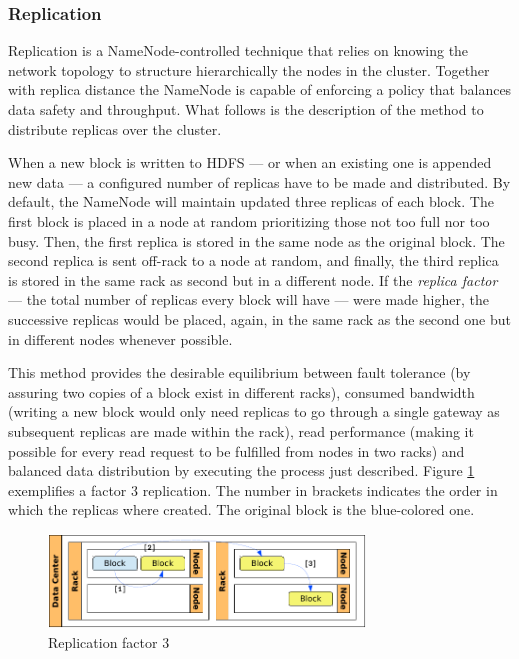 \subsubsection{Replication}\label{subsubsec:replicacionbloques}
\noindent Replication is a NameNode-controlled technique that relies on knowing the network topology to structure hierarchically the nodes in the cluster. Together with replica distance the NameNode is capable of enforcing a policy that balances data safety and throughput. What follows is the description of the method to distribute replicas over the cluster.

When a new block is written to HDFS --- or when an existing one is appended new data --- a configured number of replicas have to be made and distributed. By default, the NameNode will maintain updated three replicas of each block. The first block is placed in a node at random prioritizing those not too full nor too busy. Then, the first replica is stored in the same node as the original block. The second replica is sent off-rack to a node at random, and finally, the third replica is stored in the same rack as second but in a different node. If the \emph{replica factor} --- the total number of replicas every block will have --- were made higher, the successive replicas would be placed, again, in the same rack as the second one but in different nodes whenever possible.

This method provides the desirable equilibrium between fault tolerance (by assuring two copies of a block exist in different racks), consumed bandwidth (writing a new block would only need replicas to go through a single gateway as subsequent replicas are made within the rack), read performance (making it possible for every read request to be fulfilled from nodes in two racks) and balanced data distribution by executing the process just described. Figure \ref{fig:repbloque} exemplifies a factor 3 replication. The number in brackets indicates the order in which the replicas where created. The original block is the blue-colored one.

\begin{figure}[tbp]
\begin{center}
\includegraphics[width=0.75\textwidth]{imagenes/019.pdf}
 \caption{Replication factor 3}
\label{fig:repbloque}
\end{center}
\end{figure}


